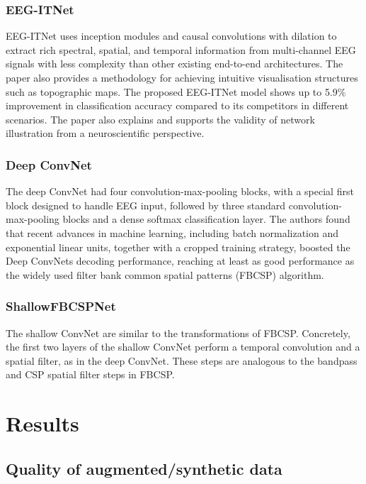 \documentclass[runningheads]{llncs}
\begin{document}
\subsubsection{EEG-ITNet}
EEG-ITNet uses inception modules and causal convolutions with dilation to extract rich spectral, spatial, and temporal information from multi-channel EEG signals with less complexity than other existing end-to-end architectures. The paper also provides a methodology for achieving intuitive visualisation structures such as topographic maps. The proposed EEG-ITNet model shows up to 5.9\% improvement in classification accuracy compared to its competitors in different scenarios. The paper also explains and supports the validity of network illustration from a neuroscientific perspective. 

\subsubsection{Deep ConvNet}
The deep ConvNet had four convolution-max-pooling blocks, with a special first block designed to handle EEG input, followed by three standard convolution-max-pooling blocks and a dense softmax classification layer. The authors found that recent advances in machine learning, including batch normalization and exponential linear units, together with a cropped training strategy, boosted the Deep ConvNets decoding performance, reaching at least as good performance as the widely used filter bank common spatial patterns (FBCSP) algorithm.


\subsubsection{ShallowFBCSPNet}
The shallow ConvNet are similar to the transformations of FBCSP. Concretely, the first two layers of the shallow ConvNet perform a temporal convolution and a spatial filter, as in the deep ConvNet. These steps are analogous to the bandpass and CSP spatial filter steps in FBCSP.

\section{Results}

\subsection{Quality of augmented/synthetic data}
\end{document}
